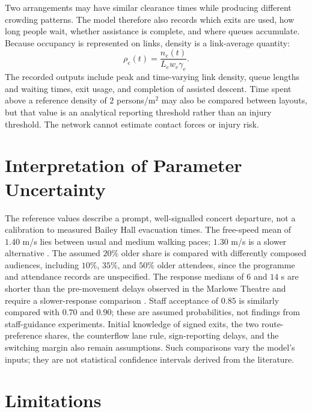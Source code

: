 \documentclass[11pt,a4paper]{article}
\begin{document}
Two arrangements may have similar clearance times while producing different crowding patterns. The model therefore also records which exits are used, how long people wait, whether assistance is complete, and where queues accumulate. Because occupancy is represented on links, density is a link-average quantity:
\begin{equation}\label{eq:density}
\rho_e(t)=\frac{n_e(t)}{L_ew_e\gamma_e}.
\end{equation}
The recorded outputs include peak and time-varying link density, queue lengths and waiting times, exit usage, and completion of assisted descent. Time spent above a reference density of $2$ persons/m$^2$ may also be compared between layouts, but that value is an analytical reporting threshold rather than an injury threshold. The network cannot estimate contact forces or injury risk.

\section{Interpretation of Parameter Uncertainty}

The reference values describe a prompt, well-signalled concert departure, not a calibration to measured Bailey Hall evacuation times. The free-speed mean of $1.40$ m/s lies between usual and medium walking paces; $1.30$ m/s is a slower alternative \cite{murtagh}. The assumed $20\%$ older share is compared with differently composed audiences, including $10\%$, $35\%$, and $50\%$ older attendees, since the programme and attendance records are unspecified. The response medians of $6$ and $14$ s are shorter than the pre-movement delays observed in the Marlowe Theatre and require a slower-response comparison \cite{galea2017theatre}. Staff acceptance of $0.85$ is similarly compared with $0.70$ and $0.90$; these are assumed probabilities, not findings from staff-guidance experiments. Initial knowledge of signed exits, the two route-preference shares, the counterflow lane rule, sign-reporting delays, and the switching margin also remain assumptions. Such comparisons vary the model's inputs; they are not statistical confidence intervals derived from the literature.




\section{Limitations}
\end{document}
